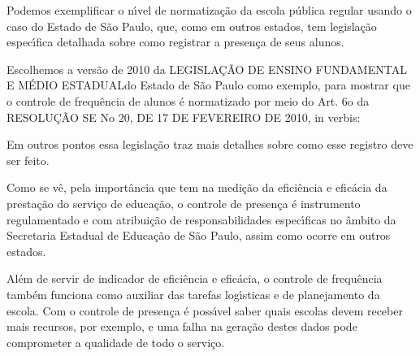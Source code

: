 \documentclass[
12pt,		%
openright,	%
twoside,  %
a4paper,			%
chapter=TITLE,		%
english,			%
french,				%
spanish,			%
brazil				%
]{USPSC-classe/USPSC}
\begin{document}
Podemos exemplificar o n\'{\i}vel de normatiza\c{c}\~ao da escola p\'ublica regular usando o caso do Estado de S\~ao Paulo, que, como em outros estados, tem legisla\c{c}\~ao espec\'{\i}fica detalhada sobre como registrar a presen\c{c}a de seus alunos.










Escolhemos a vers\~ao de 2010 da \textquotedbl LEGISLA\c{C}\~AO DE ENSINO FUNDAMENTAL E M\'EDIO ESTADUAL\textquotedbl  do Estado de S\~ao Paulo como exemplo, para mostrar que o controle de frequ\^encia de alunos \'e normatizado por meio do Art. 6o da RESOLU\c{C}\~AO SE No 20, DE 17 DE FEVEREIRO DE 2010, in verbis:











\noindent\begin{center}\mbox{\centering{}}\end{center}


Em outros pontos essa legisla\c{c}\~ao traz mais detalhes sobre como esse registro deve ser feito.










Como se v\^e, pela import\^ancia que tem na medi\c{c}\~ao da efici\^encia e efic\'acia da presta\c{c}\~ao do servi\c{c}o de educa\c{c}\~ao, o controle de presen\c{c}a \'e instrumento regulamentado e com atribui\c{c}\~ao de responsabilidades espec\'{\i}ficas no \^ambito da Secretaria Estadual de Educa\c{c}\~ao de S\~ao Paulo, assim como ocorre em outros estados.










Al\'em de servir de indicador de efici\^encia e efic\'acia, o controle de frequ\^encia tamb\'em funciona como auxiliar das tarefas log\'{\i}sticas e de planejamento da escola. Com o controle de presen\c{c}a \'e poss\'{\i}vel saber quais escolas devem receber mais recursos, por exemplo, e uma falha na gera\c{c}\~ao destes dados pode comprometer a qualidade de todo o servi\c{c}o.
\end{document}
